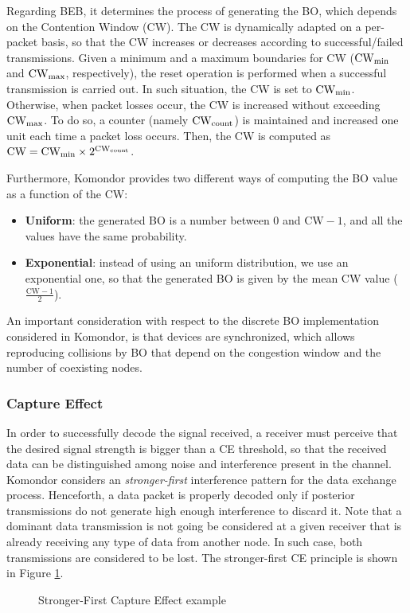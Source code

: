 \documentclass[a4paper]{article}
\begin{document}
		Regarding BEB, it determines the process of generating the BO, which depends on the Contention Window (CW). The CW is dynamically adapted on a per-packet basis, so that the CW increases or decreases according to successful/failed transmissions. Given a minimum and a maximum boundaries for CW ($\rm CW_{\rm min}$ and $\rm CW_{\rm max}$, respectively), the reset operation is performed when a successful transmission is carried out. In such situation, the CW is set to $\rm CW_{\rm min}$. Otherwise, when packet losses occur, the CW is increased without exceeding $\rm CW_{\rm max}$. To do so, a counter (namely $\rm CW_{\rm count}$) is maintained and increased one unit each time a packet loss occurs. Then, the CW is computed as $\rm CW = \rm CW_{\rm min} \times 2^{\rm CW_{\rm count}}$.
		
		Furthermore, Komondor provides two different ways of computing the BO value as a function of the CW:
		\begin{itemize}
			\item \textbf{Uniform}: the generated BO is a number between 0 and $\text{CW}-1$, and all the values have the same probability.
			\item \textbf{Exponential}: instead of using an uniform distribution, we use an exponential one, so that the generated BO is given by the mean CW value ($\frac{\text{CW}-1}{2}$).
		\end{itemize}
				
		An important consideration with respect to the discrete BO implementation considered in Komondor, is that devices are synchronized, which allows reproducing collisions by BO that depend on the congestion window and the number of coexisting nodes.
		
		
		\subsubsection{Capture Effect}
		\label{section:capture_effect}
		In order to successfully decode the signal received, a receiver must perceive that the desired signal strength is bigger than a CE threshold, so that the received data can be distinguished among noise and interference present in the channel. Komondor considers an \emph{stronger-first} interference pattern for the data exchange process. Henceforth, a data packet is properly decoded only if posterior transmissions do not generate high enough interference to discard it. Note that a dominant data transmission is not going be considered at a given receiver that is already receiving any type of data from another node. In such case, both transmissions are considered to be lost. The stronger-first CE principle is shown in Figure \ref{fig:capture_effect}. 
		\begin{figure}[h!]
			\centering
			\caption{Stronger-First Capture Effect example}
			\label{fig:capture_effect}
		\end{figure}
	
\end{document}

